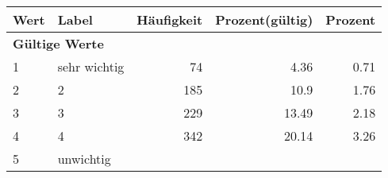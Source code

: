      \begin{longtable}{lXrrr}
     \toprule
     \textbf{Wert} & \textbf{Label} & \textbf{Häufigkeit} & \textbf{Prozent(gültig)} & \textbf{Prozent} \\
     \endhead
     \midrule
     \multicolumn{5}{l}{\textbf{Gültige Werte}}\\

     1 &
     \multicolumn{1}{X}{ sehr wichtig   } &


       \num{74} &
       \num[round-mode=places,round-precision=2]{4,36} &
         \num[round-mode=places,round-precision=2]{0,71} \\

     2 &
     \multicolumn{1}{X}{ 2   } &


       \num{185} &
       \num[round-mode=places,round-precision=2]{10,9} &
         \num[round-mode=places,round-precision=2]{1,76} \\

     3 &
     \multicolumn{1}{X}{ 3   } &


       \num{229} &
       \num[round-mode=places,round-precision=2]{13,49} &
         \num[round-mode=places,round-precision=2]{2,18} \\

     4 &
     \multicolumn{1}{X}{ 4   } &


       \num{342} &
       \num[round-mode=places,round-precision=2]{20,14} &
         \num[round-mode=places,round-precision=2]{3,26} \\

     5 &
     \multicolumn{1}{X}{ unwichtig   } &



\end{longtable}
